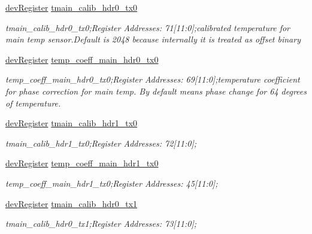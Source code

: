 \begin{DoxyCompactItemize}
\mbox{\hyperlink{classdev_register}{dev\+Register}} \mbox{\hyperlink{class_o_p_t3101_registers_a399ffd68e53fd718d8c86cac5570b0f4}{tmain\+\_\+calib\+\_\+hdr0\+\_\+tx0}}
\begin{DoxyCompactList}\small\item\em tmain\+\_\+calib\+\_\+hdr0\+\_\+tx0;Register Addresses\+: 71\mbox{[}11\+:0\mbox{]};calibrated temperature for main temp sensor.\+Default is 2048 because internally it is treated as offset binary \end{DoxyCompactList}\item 
\mbox{\hyperlink{classdev_register}{dev\+Register}} \mbox{\hyperlink{class_o_p_t3101_registers_a9bf60b3ad71f0a5023919a9fe626ded2}{temp\+\_\+coeff\+\_\+main\+\_\+hdr0\+\_\+tx0}}
\begin{DoxyCompactList}\small\item\em temp\+\_\+coeff\+\_\+main\+\_\+hdr0\+\_\+tx0;Register Addresses\+: 69\mbox{[}11\+:0\mbox{]};temperature coefficient for phase correction for main temp. By default means phase change for 64 degrees of temperature. \end{DoxyCompactList}\item 
\mbox{\hyperlink{classdev_register}{dev\+Register}} \mbox{\hyperlink{class_o_p_t3101_registers_a45e6d0d64cb7fea67b3ce7483a480eee}{tmain\+\_\+calib\+\_\+hdr1\+\_\+tx0}}
\begin{DoxyCompactList}\small\item\em tmain\+\_\+calib\+\_\+hdr1\+\_\+tx0;Register Addresses\+: 72\mbox{[}11\+:0\mbox{]}; \end{DoxyCompactList}\item 
\mbox{\hyperlink{classdev_register}{dev\+Register}} \mbox{\hyperlink{class_o_p_t3101_registers_a72513d9b96ded4e78b1e20a11a9e974e}{temp\+\_\+coeff\+\_\+main\+\_\+hdr1\+\_\+tx0}}
\begin{DoxyCompactList}\small\item\em temp\+\_\+coeff\+\_\+main\+\_\+hdr1\+\_\+tx0;Register Addresses\+: 45\mbox{[}11\+:0\mbox{]}; \end{DoxyCompactList}\item 
\mbox{\hyperlink{classdev_register}{dev\+Register}} \mbox{\hyperlink{class_o_p_t3101_registers_ac520723279074397a7d777b16e6bcae7}{tmain\+\_\+calib\+\_\+hdr0\+\_\+tx1}}
\begin{DoxyCompactList}\small\item\em tmain\+\_\+calib\+\_\+hdr0\+\_\+tx1;Register Addresses\+: 73\mbox{[}11\+:0\mbox{]}; \end{DoxyCompactList}\item 

\end{DoxyCompactItemize}
